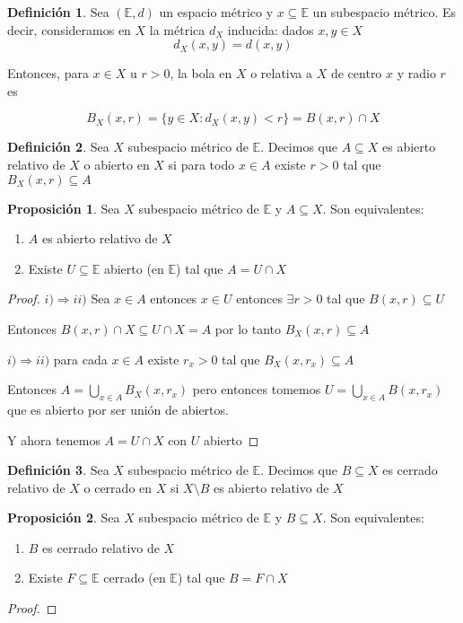 \documentclass[12pt]{article}
\newcommand{\E}{\mathbb{E}}
\newcommand{\Ra}{\Rightarrow}
\theoremstyle{definition}
\newtheorem{definition}{Definición}[section]
\newtheorem{prop}{Proposición}
\begin{document}
\begin{definition}
  Sea $(\E,d)$ un espacio métrico y $x \subseteq \E$ un subespacio métrico. Es decir, consideramos en $X$ la métrica $d_X$ inducida: dados $x,y \in X$
  $$ d_X (x,y) = d(x,y)$$

  Entonces, para $x \in X$ u $r >0$, la bola en $X$ o relativa a $X$ de centro $x$ y radio $r$ es 

  $$ B_X(x,r) = \{y \in X : d_X(x,y) < r\} = B(x,r) \cap X$$
\end{definition}

\begin{definition}
  Sea $X$ subespacio métrico de $\E$. Decimos que $A \subseteq X$ es abierto relativo de $X$ o abierto en $X$ si para todo $x \in A$ existe $r>0$ tal que $B_X(x,r )\subseteq A$
\end{definition}
\newpage
\begin{prop}
  Sea $X$ subespacio métrico de $\E$ y $A \subseteq X$. Son equivalentes:
  \begin{enumerate}
    \item $A$ es abierto relativo de $X$
    \item Existe $U\subseteq \E$ abierto (en $\E$) tal que $A = U \cap X$
  \end{enumerate}
  \begin{proof}
$i) \Ra ii)$ Sea $x \in A$ entonces $x \in U$ entonces $\exists r >0$ tal que $B(x,r) \subseteq U$

Entonces $B(x,r) \cap X \subseteq U \cap X = A$ por lo tanto $B_X(x,r) \subseteq A$

$i) \Ra ii)$ para cada $x \in A$ existe $r_x >0$ tal que $B_X(x,r_x) \subseteq A$

Entonces $A = \bigcup_{x \in A} B_X(x,r_x)$ pero entonces tomemos $U =\bigcup_{x \in A} B(x,r_x)$ que es abierto por ser unión de abiertos. 

Y ahora tenemos $A = U \cap X$ con $U$ abierto
  \end{proof}
\end{prop}
\begin{definition}
  Sea $X$ subespacio métrico de $\E$. Decimos que $B \subseteq X$ es cerrado relativo de $X$ o cerrado en $X$ si $X \setminus B$ es abierto relativo de $X$ 
\end{definition}
\begin{prop}
  Sea $X$ subespacio métrico de $\E$ y $B \subseteq X$. Son equivalentes:
  \begin{enumerate}
    \item $B$ es cerrado relativo de $X$
    \item Existe $F\subseteq \E$ cerrado (en $\E$) tal que $B = F \cap X$
  \end{enumerate}
  \begin{proof}
    
  \end{proof}
\end{prop}
\end{document}
